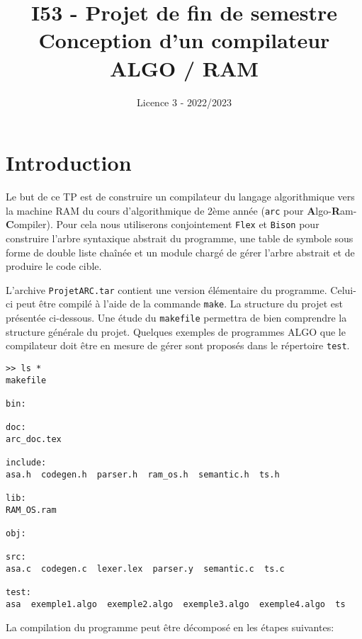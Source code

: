 \documentclass[a4paper,10pt, oneside]{article}
\begin{document}
\title{I53 - Projet de fin de semestre\\Conception d'un compilateur ALGO / RAM}

\date{Licence 3 - 2022/2023}
\maketitle

\section*{Introduction}

Le but de ce TP est de construire un compilateur du langage
algorithmique vers la machine RAM du cours d'algorithmique de 2ème
année (\texttt{arc} pour
\textbf{A}lgo-\textbf{R}am-\textbf{C}ompiler). Pour cela nous
utiliserons conjointement \texttt{Flex} et \texttt{Bison} pour
construire l'arbre syntaxique abstrait du programme, une table de
symbole sous forme de double liste chaînée et un module chargé de
gérer l'arbre abstrait et de produire le code cible.

L'archive \texttt{ProjetARC.tar} contient une version élémentaire du
programme. Celui-ci peut être compilé à l'aide de la commande
\texttt{make}. La structure du projet est présentée ci-dessous. Une
étude du \texttt{makefile} permettra de bien comprendre la structure
générale du projet. Quelques exemples de programmes ALGO que le
compilateur doit être en mesure de gérer sont proposés dans le
répertoire \texttt{test}.


\begin{lstlisting}[]
>> ls *
makefile

bin:

doc:
arc_doc.tex

include:
asa.h  codegen.h  parser.h  ram_os.h  semantic.h  ts.h

lib:
RAM_OS.ram

obj:

src:
asa.c  codegen.c  lexer.lex  parser.y  semantic.c  ts.c

test:
asa  exemple1.algo  exemple2.algo  exemple3.algo  exemple4.algo  ts

\end{lstlisting}


La compilation du programme peut être décomposé en les étapes
suivantes:
\end{document}
